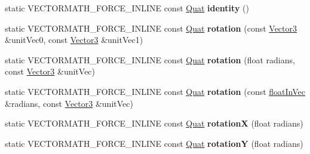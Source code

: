 \begin{DoxyCompactItemize}
\item 
\mbox{\label{classVectormath_1_1Aos_1_1Quat_a1d016bcafbde5c1cc3018d870740936c}} 
static V\+E\+C\+T\+O\+R\+M\+A\+T\+H\+\_\+\+F\+O\+R\+C\+E\+\_\+\+I\+N\+L\+I\+NE const \hyperlink{classVectormath_1_1Aos_1_1Quat}{Quat} {\bfseries identity} ()
\item 
\mbox{\label{classVectormath_1_1Aos_1_1Quat_a6cfb51e0a0d165f180c27f2a14c45267}} 
static V\+E\+C\+T\+O\+R\+M\+A\+T\+H\+\_\+\+F\+O\+R\+C\+E\+\_\+\+I\+N\+L\+I\+NE const \hyperlink{classVectormath_1_1Aos_1_1Quat}{Quat} {\bfseries rotation} (const \hyperlink{classVectormath_1_1Aos_1_1Vector3}{Vector3} \&unit\+Vec0, const \hyperlink{classVectormath_1_1Aos_1_1Vector3}{Vector3} \&unit\+Vec1)
\item 
\mbox{\label{classVectormath_1_1Aos_1_1Quat_abf5142c735bddf65c1b73e3d425dd7bc}} 
static V\+E\+C\+T\+O\+R\+M\+A\+T\+H\+\_\+\+F\+O\+R\+C\+E\+\_\+\+I\+N\+L\+I\+NE const \hyperlink{classVectormath_1_1Aos_1_1Quat}{Quat} {\bfseries rotation} (float radians, const \hyperlink{classVectormath_1_1Aos_1_1Vector3}{Vector3} \&unit\+Vec)
\item 
\mbox{\label{classVectormath_1_1Aos_1_1Quat_a4cb77757e0f7d50083e9c3f34c4b3eef}} 
static V\+E\+C\+T\+O\+R\+M\+A\+T\+H\+\_\+\+F\+O\+R\+C\+E\+\_\+\+I\+N\+L\+I\+NE const \hyperlink{classVectormath_1_1Aos_1_1Quat}{Quat} {\bfseries rotation} (const \hyperlink{classVectormath_1_1floatInVec}{float\+In\+Vec} \&radians, const \hyperlink{classVectormath_1_1Aos_1_1Vector3}{Vector3} \&unit\+Vec)
\item 
\mbox{\label{classVectormath_1_1Aos_1_1Quat_adb1cf746cbe7fa5cf69664b436be84c2}} 
static V\+E\+C\+T\+O\+R\+M\+A\+T\+H\+\_\+\+F\+O\+R\+C\+E\+\_\+\+I\+N\+L\+I\+NE const \hyperlink{classVectormath_1_1Aos_1_1Quat}{Quat} {\bfseries rotationX} (float radians)
\item 
\mbox{\label{classVectormath_1_1Aos_1_1Quat_ab0b7ce8590c59acd31ed131321d08704}} 
static V\+E\+C\+T\+O\+R\+M\+A\+T\+H\+\_\+\+F\+O\+R\+C\+E\+\_\+\+I\+N\+L\+I\+NE const \hyperlink{classVectormath_1_1Aos_1_1Quat}{Quat} {\bfseries rotationY} (float radians)
\item 

\end{DoxyCompactItemize}
